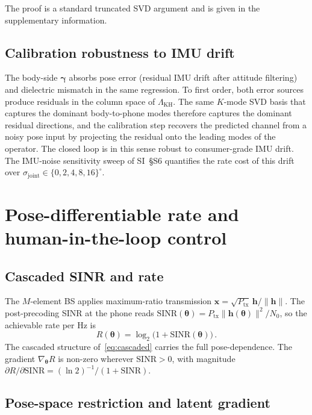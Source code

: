 \documentclass[journal,twocolumn,10pt]{IEEEtran}
\theoremstyle{plain}
\theoremstyle{definition}
\theoremstyle{remark}
\newcommand{\xx}{\mathbf{x}}
\newcommand{\hh}{\bm{h}}
\newcommand{\thetab}{\bm{\theta}}
\newcommand{\gammab}{\bm{\gamma}}
\begin{document}
The proof is a standard truncated SVD argument and is given in
the supplementary information.

\subsection{Calibration robustness to IMU drift}

The body-side $\gammab$ absorbs pose error (residual IMU drift
after attitude filtering) and dielectric mismatch in the same
regression. To first order, both error sources produce residuals
in the column space of $\Lambda_{\mathrm{KH}}$. The same $K$-mode
SVD basis that captures the dominant body-to-phone modes therefore
captures the dominant residual directions, and the calibration
step recovers the predicted channel from a noisy pose input by
projecting the residual onto the leading modes of the operator.
The closed loop is in this sense robust to consumer-grade IMU
drift. The IMU-noise sensitivity sweep of SI~\S{}S6 quantifies the
rate cost of this drift over $\sigma_{\mathrm{joint}} \in
\{0, 2, 4, 8, 16\}^{\circ}$.


\section{Pose-differentiable rate and human-in-the-loop control}\label{sec:control}

\subsection{Cascaded SINR and rate}

The $M$-element BS applies maximum-ratio transmission
$\xx = \sqrt{P_{\mathrm{tx}}}\,\hh / \|\hh\|$. The post-precoding
SINR at the phone reads
$\mathrm{SINR}(\thetab) = P_{\mathrm{tx}} \|\hh(\thetab)\|^{2} / N_0$,
so the achievable rate per Hz is
\begin{equation}\label{eq:rate}
R(\thetab) = \log_2\bigl(1 + \mathrm{SINR}(\thetab)\bigr)\,.
\end{equation}
The cascaded structure of~\eqref{eq:cascaded} carries the full
pose-dependence. The gradient $\nabla_{\thetab} R$ is non-zero
wherever $\mathrm{SINR}>0$, with magnitude
$\partial R / \partial \mathrm{SINR} = (\ln 2)^{-1}/(1 + \mathrm{SINR})$.

\subsection{Pose-space restriction and latent gradient}\label{sec:vposer-latent}
\end{document}

